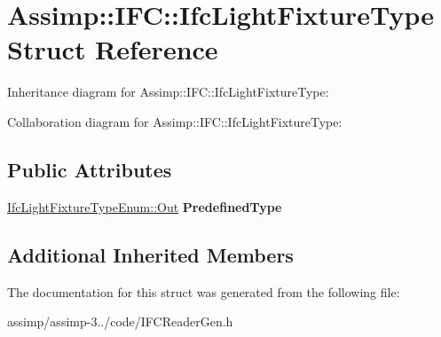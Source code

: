 \hypertarget{struct_assimp_1_1_i_f_c_1_1_ifc_light_fixture_type}{\section{Assimp\+:\+:I\+F\+C\+:\+:Ifc\+Light\+Fixture\+Type Struct Reference}
\label{struct_assimp_1_1_i_f_c_1_1_ifc_light_fixture_type}
}


Inheritance diagram for Assimp\+:\+:I\+F\+C\+:\+:Ifc\+Light\+Fixture\+Type\+:


Collaboration diagram for Assimp\+:\+:I\+F\+C\+:\+:Ifc\+Light\+Fixture\+Type\+:
\subsection*{Public Attributes}
\begin{DoxyCompactItemize}
\item 
\hypertarget{struct_assimp_1_1_i_f_c_1_1_ifc_light_fixture_type_a818f076a25a21ff9bcf929b57aa90af0}{\hyperlink{classboost_1_1shared__ptr}{Ifc\+Light\+Fixture\+Type\+Enum\+::\+Out} {\bfseries Predefined\+Type}}\label{struct_assimp_1_1_i_f_c_1_1_ifc_light_fixture_type_a818f076a25a21ff9bcf929b57aa90af0}

\end{DoxyCompactItemize}
\subsection*{Additional Inherited Members}


The documentation for this struct was generated from the following file\+:\begin{DoxyCompactItemize}
\item 
assimp/assimp-\/3../code/I\+F\+C\+Reader\+Gen.\+h\end{DoxyCompactItemize}
